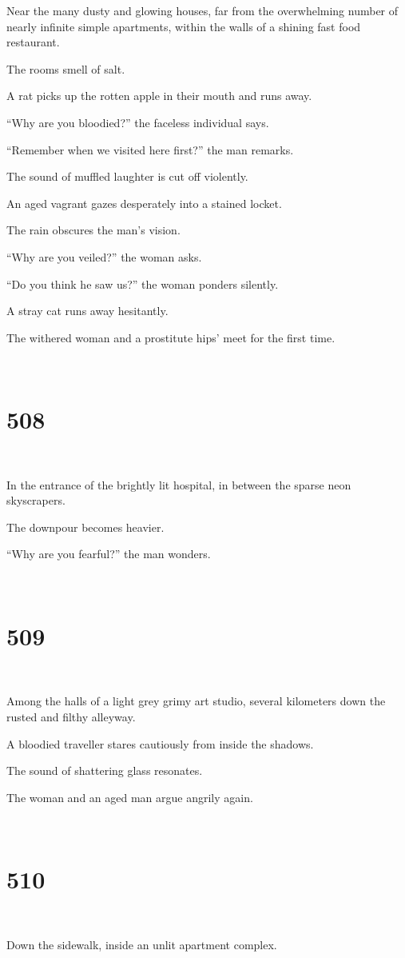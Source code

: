 \documentclass{report}
\begin{document}
Near the many dusty and glowing houses, far from the overwhelming number of nearly infinite simple apartments, within the walls of a shining fast food restaurant.

The rooms smell of salt.

A rat picks up the rotten apple in their mouth and runs away.

``Why are you bloodied?'' the faceless individual says.

``Remember when we visited here first?'' the man remarks.

The sound of muffled laughter is cut off violently.

An aged vagrant gazes desperately into a stained locket.

The rain obscures the man's vision.

``Why are you veiled?'' the woman asks.

``Do you think he saw us?'' the woman ponders silently.

A stray cat runs away hesitantly.

The withered woman and a prostitute hips' meet for the first time.

~
\chapter*{508}
~

In the entrance of the brightly lit hospital, in between the sparse neon skyscrapers.

The downpour becomes heavier.

``Why are you fearful?'' the man wonders.

~
\chapter*{509}
~

Among the halls of a light grey grimy art studio, several kilometers down the rusted and filthy alleyway.

A bloodied traveller stares cautiously from inside the shadows.

The sound of shattering glass resonates.

The woman and an aged man argue angrily again.

~
\chapter*{510}
~

Down the sidewalk, inside an unlit apartment complex.
\end{document}
